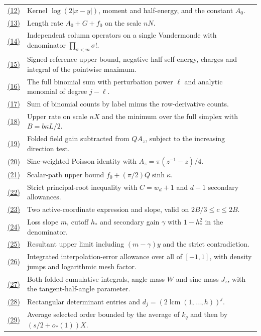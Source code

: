 \documentclass[11pt,a4paper]{article}
\providecommand{\real}[1]{#1}
\begin{document}
{{\begin{longtable}[]{@{}
  >{\raggedright\arraybackslash}p{(\linewidth - 2\tabcolsep) * \real{0.22}}
  >{\raggedright\arraybackslash}p{(\linewidth - 2\tabcolsep) * \real{0.78}}@{}}
\hyperref[eq:12]{(12)} & Kernel \(\log(2\lvert x-y\rvert)\), moment and half-energy, and the constant \(A_0\). \\
\hyperref[eq:13]{(13)} & Length rate \(A_0+G+f_0\) on the scale \(nN\). \\
\hyperref[eq:14]{(14)} & Independent column operators on a single Vandermonde with denominator \(\prod_{\sigma<m}\sigma!\). \\
\hyperref[eq:15]{(15)} & Signed-reference upper bound, negative half self-energy, charges and integral of the pointwise maximum. \\
\hyperref[eq:16]{(16)} & The full binomial sum with perturbation power \(\ell\) and analytic monomial of degree \(j-\ell\). \\
\hyperref[eq:17]{(17)} & Sum of binomial counts by label minus the row-derivative counts. \\
\hyperref[eq:18]{(18)} & Upper rate on scale \(nX\) and the minimum over the full simplex with \(B=b\kappa L/2\). \\
\hyperref[eq:19]{(19)} & Folded field gain subtracted from \(QA_z\), subject to the increasing direction test. \\
\hyperref[eq:20]{(20)} & Sine-weighted Poisson identity with \(A_z=\pi(z^{-1}-z)/4\). \\
\hyperref[eq:21]{(21)} & Scalar-path upper bound \(f_0+(\pi/2)Q\sinh\kappa\). \\
\hyperref[eq:22]{(22)} & Strict principal-root inequality with \(C=w_d+1\) and \(d-1\) secondary allowances. \\
\hyperref[eq:23]{(23)} & Two active-coordinate expression and slope, valid on \(2B/3\le c\le2B\). \\
\hyperref[eq:24]{(24)} & Loss slope \(m\), cutoff \(h_*\) and secondary gain \(\gamma\) with \(1-h_*^2\) in the denominator. \\
\hyperref[eq:25]{(25)} & Resultant upper limit including \((m-\gamma)y\) and the strict contradiction. \\
\hyperref[eq:26]{(26)} & Integrated interpolation-error allowance over all of \([-1,1]\), with density jumps and logarithmic mesh factor. \\
\hyperref[eq:27]{(27)} & Both folded cumulative integrals, angle mass \(W\) and sine mass \(J_z\), with the tangent-half-angle parameter. \\
\hyperref[eq:28]{(28)} & Rectangular determinant entries and \(d_j=(2\operatorname{lcm}(1,\ldots,h))^j\). \\
\hyperref[eq:29]{(29)} & Average selected order bounded by the average of \(k_q\) and then by \((s/2+o_*(1))X\). \\

\end{longtable}}}
\end{document}
